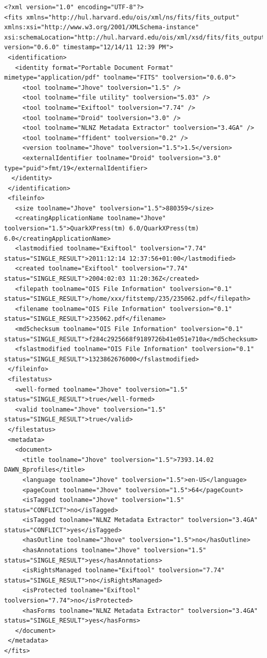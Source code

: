 \pagebreak
\lstset{
language=XML,
basicstyle=\tiny\ttfamily,
label=lst:fits_example,
caption=An example FITS output file}
\begin{lstlisting}
<?xml version="1.0" encoding="UTF-8"?>
<fits xmlns="http://hul.harvard.edu/ois/xml/ns/fits/fits_output" xmlns:xsi="http://www.w3.org/2001/XMLSchema-instance" xsi:schemaLocation="http://hul.harvard.edu/ois/xml/xsd/fits/fits_output.xsd" version="0.6.0" timestamp="12/14/11 12:39 PM">
 <identification>
   <identity format="Portable Document Format" mimetype="application/pdf" toolname="FITS" toolversion="0.6.0">
     <tool toolname="Jhove" toolversion="1.5" />
     <tool toolname="file utility" toolversion="5.03" />
     <tool toolname="Exiftool" toolversion="7.74" />
     <tool toolname="Droid" toolversion="3.0" />
     <tool toolname="NLNZ Metadata Extractor" toolversion="3.4GA" />
     <tool toolname="ffident" toolversion="0.2" />
     <version toolname="Jhove" toolversion="1.5">1.5</version>
     <externalIdentifier toolname="Droid" toolversion="3.0" type="puid">fmt/19</externalIdentifier>
  </identity>
 </identification>
 <fileinfo>
   <size toolname="Jhove" toolversion="1.5">880359</size>
   <creatingApplicationName toolname="Jhove" toolversion="1.5">QuarkXPress(tm) 6.0/QuarkXPress(tm) 6.0</creatingApplicationName>
   <lastmodified toolname="Exiftool" toolversion="7.74" status="SINGLE_RESULT">2011:12:14 12:37:56+01:00</lastmodified>
   <created toolname="Exiftool" toolversion="7.74" status="SINGLE_RESULT">2004:02:03 11:20:36Z</created>
   <filepath toolname="OIS File Information" toolversion="0.1" status="SINGLE_RESULT">/home/xxx/fitstemp/235/235062.pdf</filepath>
   <filename toolname="OIS File Information" toolversion="0.1" status="SINGLE_RESULT">235062.pdf</filename>
   <md5checksum toolname="OIS File Information" toolversion="0.1" status="SINGLE_RESULT">f284c2925668f9189726b41e051e710a</md5checksum>
   <fslastmodified toolname="OIS File Information" toolversion="0.1" status="SINGLE_RESULT">1323862676000</fslastmodified>
 </fileinfo>
 <filestatus>
   <well-formed toolname="Jhove" toolversion="1.5" status="SINGLE_RESULT">true</well-formed>
   <valid toolname="Jhove" toolversion="1.5" status="SINGLE_RESULT">true</valid>
 </filestatus>
 <metadata>
   <document>
     <title toolname="Jhove" toolversion="1.5">7393.14.02 DAWN_Bprofiles</title>
     <language toolname="Jhove" toolversion="1.5">en-US</language>
     <pageCount toolname="Jhove" toolversion="1.5">64</pageCount>
     <isTagged toolname="Jhove" toolversion="1.5" status="CONFLICT">no</isTagged>
     <isTagged toolname="NLNZ Metadata Extractor" toolversion="3.4GA" status="CONFLICT">yes</isTagged>
     <hasOutline toolname="Jhove" toolversion="1.5">no</hasOutline>
     <hasAnnotations toolname="Jhove" toolversion="1.5" status="SINGLE_RESULT">yes</hasAnnotations>
     <isRightsManaged toolname="Exiftool" toolversion="7.74" status="SINGLE_RESULT">no</isRightsManaged>
     <isProtected toolname="Exiftool" toolversion="7.74">no</isProtected>
     <hasForms toolname="NLNZ Metadata Extractor" toolversion="3.4GA" status="SINGLE_RESULT">yes</hasForms>
   </document>
 </metadata>
</fits>
\end{lstlisting}
\pagebreak


